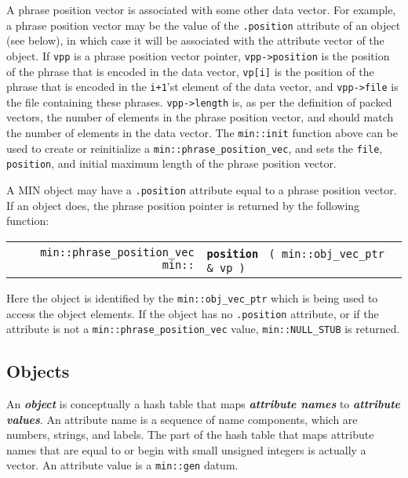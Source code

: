 \documentclass[12pt]{article}
\makeatletter
\newcommand{\key}[1]{{\bf \em #1}\index{#1}}
\newcommand{\skey}[2]{{\bf \em #1#2}\index{#1}}
\newcommand{\ttindex}[1]{\index{#1@{\tt #1}}}
\newcommand{\minindex}[1]{\ttindex{min::#1}\ttindex{#1}}
\newcommand{\EOL}{\penalty \exhyphenpenalty}
\newenvironment{indpar}[1][0.3in]%
	{\begin{list}{}%
		     {\setlength{\itemsep}{0in}%
		      \setlength{\topsep}{0in}%
		      \setlength{\parsep}{1ex}%
		      \setlength{\labelwidth}{#1}%
		      \setlength{\leftmargin}{#1}%
		      \addtolength{\leftmargin}{\labelsep}}%
	 \item}%
	{\end{list}}
\newcommand{\LABEL}[1]{\label{#1}}
\newcommand{\MINKEY}[1]{{\tt \bf #1}\minindex{#1}}
\makeatother
\begin{document}
A phrase position vector is associated with some other data vector.
For example, a phrase position vector may be the value of the
{\tt .position} attribute of an object
(see below), in which case it will be associated with
the attribute vector of the object.
If {\tt vpp} is a phrase position vector pointer, {\tt vpp->\EOL position}
is the position of the phrase that is encoded in the data vector,
{\tt vp[i]} is the position of the phrase that is encoded in
the {\tt i+1}'st element of the data vector, and
{\tt vpp->\EOL file} is the file containing these phrases.
{\tt vpp->\EOL length} is, as per the definition of packed vectors,
the number of elements in the phrase position vector, and should
match the number of elements in the data vector.
The {\tt min::\EOL init} function above can be used to create or
reinitialize a {\tt min::\EOL phrase\_\EOL position\_\EOL vec},
and sets the {\tt file}, {\tt position}, and initial maximum length
of the phrase position vector.

A MIN object may have a {\tt .position} attribute equal to a
phrase position vector.  If an object does, the phrase position
pointer is returned by the following function:

\begin{indpar}[1em]\begin{tabular}{r@{}l}
\verb|min::phrase_position_vec min::| & \MINKEY{position}
    \verb| ( min::obj_vec_ptr & vp )|
\LABEL{MIN::POSITION_OF_OBJECT_VEC_PTR} \\
\end{tabular}\end{indpar}

Here the object is identified by the {\tt min::\EOL obj\_\EOL vec\_\EOL ptr}
which is being used to access the object elements.  If the
object has no {\tt .position} attribute, or if the attribute is
not a {\tt min::\EOL phrase\_\EOL position\_\EOL vec} value,
{\tt min::\EOL NULL\_\EOL STUB} is returned.

\subsection{Objects}
\label{OBJECTS}

An \key{object} is conceptually a hash table that maps
\skey{attribute name}s to \skey{attribute value}s.
An attribute name is a sequence of name components, which
are numbers, strings, and labels.
The part of the hash table that maps attribute names that are equal to
or begin with small unsigned integers is actually a vector.
An attribute value is a \verb|min::gen| datum.
\end{document}

